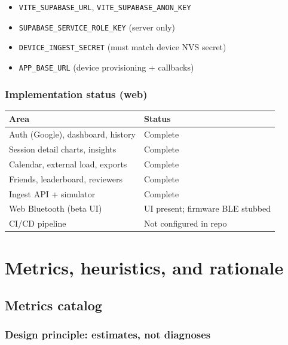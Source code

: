\documentclass[11pt,a4paper]{report}
\begin{document}
\begin{itemize}[leftmargin=*]
  \item \texttt{VITE\_SUPABASE\_URL}, \texttt{VITE\_SUPABASE\_ANON\_KEY}
  \item \texttt{SUPABASE\_SERVICE\_ROLE\_KEY} (server only)
  \item \texttt{DEVICE\_INGEST\_SECRET} (must match device NVS secret)
  \item \texttt{APP\_BASE\_URL} (device provisioning + callbacks)
\end{itemize}

\section{Implementation status (web)}

\begin{table}[h]
\centering
\begin{tabular}{@{}ll@{}}
\toprule
\textbf{Area} & \textbf{Status} \\
\midrule
Auth (Google), dashboard, history & Complete \\
Session detail charts, insights & Complete \\
Calendar, external load, exports & Complete \\
Friends, leaderboard, reviewers & Complete \\
Ingest API + simulator & Complete \\
Web Bluetooth (beta UI) & UI present; firmware BLE stubbed \\
CI/CD pipeline & Not configured in repo \\
\bottomrule
\end{tabular}
\end{table}

\part{Metrics, heuristics, and rationale}

\chapter{Metrics catalog}
\label{ch:metrics}

\section{Design principle: estimates, not diagnoses}
\end{document}
